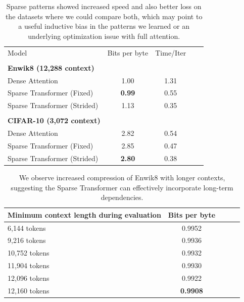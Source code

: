 \documentclass{article}
\begin{document}
\begin{table}[h]
\caption{Sparse patterns showed increased speed and also better loss on the datasets where we could compare both, which may point to a useful inductive bias in the patterns we learned or an underlying optimization issue with full attention.}
\label{compare_attn}
\vskip 0.15in
\begin{center}
\begin{small}
\begin{tabular}{lcccr}
\toprule
Model & Bits per byte & Time/Iter\\
\quad \\
\textbf{Enwik8 (12,288 context)} \\
\midrule
Dense Attention & 1.00 & 1.31\\
Sparse Transformer (Fixed) & \textbf{0.99} & 0.55 \\
Sparse Transformer (Strided) & 1.13 & 0.35 \\
\quad \\
\textbf{CIFAR-10 (3,072 context)} \\
\midrule
Dense Attention & 2.82 & 0.54 \\
Sparse Transformer (Fixed) & 2.85 & 0.47 \\
Sparse Transformer (Strided) & \textbf{2.80} & 0.38 \\

\bottomrule
\end{tabular}
\end{small}
\end{center}
\vskip -0.2in
\end{table}

\begin{table}[h]
\caption{We observe increased compression of Enwik8 with longer contexts, suggesting the Sparse Transformer can effectively incorporate long-term dependencies.}
\label{compare_ctx}
\begin{center}
\begin{small}
\begin{tabular}{lcccr}
\toprule
Minimum context length during evaluation & Bits per byte\\
\midrule
6,144 tokens & 0.9952\\
9,216 tokens & 0.9936 \\
10,752 tokens & 0.9932 \\
11,904 tokens & 0.9930 \\
12,096 tokens & 0.9922 \\
12,160 tokens & \textbf{0.9908} \\

\bottomrule
\end{tabular}
\end{small}
\end{center}
\vskip -0.12in
\end{table}
\end{document}

